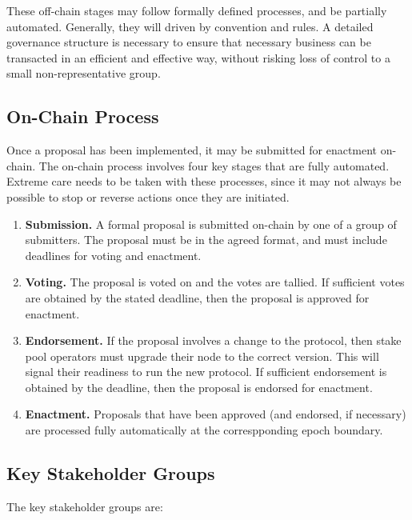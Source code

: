 These off-chain stages may follow formally defined processes, and be partially automated.  Generally, they will driven by convention and rules.  A detailed governance structure is necessary to ensure that necessary business can
be transacted in an efficient and effective way, without risking loss of control to a small non-representative group.


\subsection{On-Chain Process}

Once a proposal has been implemented, it may be submitted for enactment on-chain.  The on-chain process involves four key stages that are fully automated.  Extreme care needs to be taken with these processes,
since it may not always be possible to stop or reverse actions once they are initiated.

\begin{enumerate}
\item
  \textbf{Submission.}  A formal proposal is submitted on-chain by one of a group of submitters.  The proposal must be in the agreed format, and must include deadlines for voting and enactment.
\item
  \textbf{Voting.}  The proposal is voted on and the votes are tallied.  If sufficient votes are obtained by the stated deadline, then the proposal is approved for enactment.
\item
  \textbf{Endorsement.}  If the proposal involves a change to the protocol, then stake pool operators must upgrade their node to the correct version.  This will signal their readiness to run the new protocol.
  If sufficient endorsement is obtained by the deadline, then the proposal is endorsed for enactment.
\item
  \textbf{Enactment.}  Proposals that have been approved (and endorsed, if necessary) are processed fully automatically at the correspponding epoch boundary.
\end{enumerate}

\newpage
\subsection{Key Stakeholder Groups}

The key stakeholder groups are:

